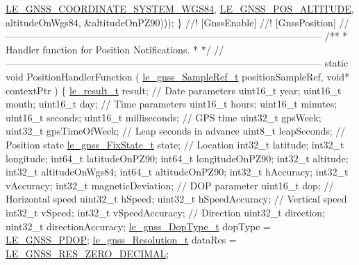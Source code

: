 \begin{DoxyCodeInclude}
{{{{      \hyperlink{le__gnss__interface_8h_a8d401bb325c46681677bd273433565bea6211648c7f9b9c1e99c533d29033a618}{LE\_GNSS\_COORDINATE\_SYSTEM\_WGS84},
                                                         \hyperlink{le__gnss__interface_8h_afd57bfce3570198fbcf0a98d81dab1c9aee4fd11cded12c22af6363ac132e30a3}{LE\_GNSS\_POS\_ALTITUDE},
                                                         altitudeOnWgs84,
                                                         &altitudeOnPZ90)));
\}\textcolor{comment}{}
\textcolor{comment}{//! [GnssEnable]}
\textcolor{comment}{}\textcolor{comment}{}
\textcolor{comment}{//! [GnssPosition]}
\textcolor{comment}{}\textcolor{comment}{//--------------------------------------------------------------------------------------------------}\textcolor{comment}{}
\textcolor{comment}{/**}
\textcolor{comment}{ * Handler function for Position Notifications.}
\textcolor{comment}{ *}
\textcolor{comment}{ */}
\textcolor{comment}{//--------------------------------------------------------------------------------------------------}
\textcolor{keyword}{static} \textcolor{keywordtype}{void} PositionHandlerFunction
(
    \hyperlink{le__gnss__interface_8h_ac9577035f26d6b7f48615670eb72102a}{le\_gnss\_SampleRef\_t} positionSampleRef,
    \textcolor{keywordtype}{void}* contextPtr
)
\{
    \hyperlink{le__basics_8h_a1cca095ed6ebab24b57a636382a6c86c}{le\_result\_t} result;
    \textcolor{comment}{// Date parameters}
    uint16\_t year;
    uint16\_t month;
    uint16\_t day;
    \textcolor{comment}{// Time parameters}
    uint16\_t hours;
    uint16\_t minutes;
    uint16\_t seconds;
    uint16\_t milliseconds;
    \textcolor{comment}{// GPS time}
    uint32\_t gpsWeek;
    uint32\_t gpsTimeOfWeek;
    \textcolor{comment}{// Leap seconds in advance}
    uint8\_t leapSeconds;
    \textcolor{comment}{// Position state}
    \hyperlink{le__gnss__interface_8h_abcb86aa054abc7a32d2f5a7363387ef1}{le\_gnss\_FixState\_t} state;
    \textcolor{comment}{// Location}
    int32\_t     latitude;
    int32\_t     longitude;
    int64\_t     latitudeOnPZ90;
    int64\_t     longitudeOnPZ90;
    int32\_t     altitude;
    int32\_t     altitudeOnWgs84;
    int64\_t     altitudeOnPZ90;
    int32\_t     hAccuracy;
    int32\_t     vAccuracy;
    int32\_t     magneticDeviation;
    \textcolor{comment}{// DOP parameter}
    uint16\_t dop;
    \textcolor{comment}{// Horizontal speed}
    uint32\_t hSpeed;
    uint32\_t hSpeedAccuracy;
    \textcolor{comment}{// Vertical speed}
    int32\_t vSpeed;
    int32\_t vSpeedAccuracy;
    \textcolor{comment}{// Direction}
    uint32\_t direction;
    uint32\_t directionAccuracy;
    \hyperlink{le__gnss__interface_8h_aa3dbc8648a864e2c1e67095034150678}{le\_gnss\_DopType\_t} dopType = \hyperlink{le__gnss__interface_8h_aa3dbc8648a864e2c1e67095034150678af07053c03690aaf0e246ff9462abaafe}{LE\_GNSS\_PDOP};
    \hyperlink{le__gnss__interface_8h_aaf5d256c75737a2189c8da7bfed5da0d}{le\_gnss\_Resolution\_t} dataRes = \hyperlink{le__gnss__interface_8h_aaf5d256c75737a2189c8da7bfed5da0da17a6752c8b3a5f04e6e32503eb8336ab}{LE\_GNSS\_RES\_ZERO\_DECIMAL};

}}}}
\end{DoxyCodeInclude}
